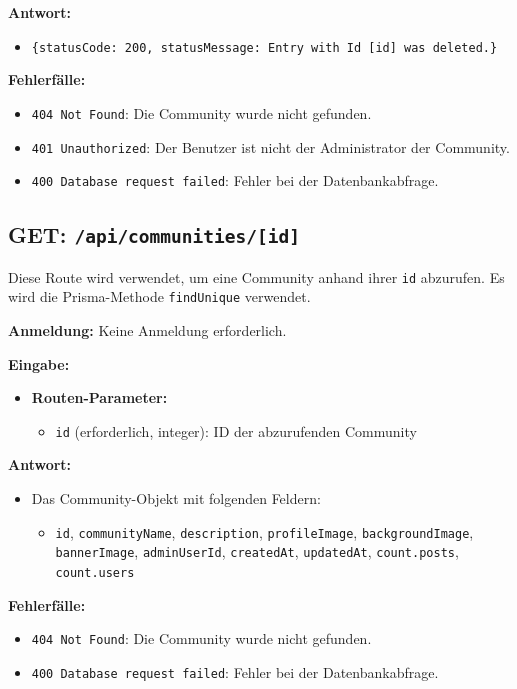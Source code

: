 \documentclass[a4paper,12pt]{article}
\begin{document}
\textbf{Antwort:}
\begin{itemize}
    \item \texttt{\{statusCode: 200, statusMessage: Entry with Id [id] was deleted.\}}
\end{itemize}

\textbf{Fehlerfälle:}
\begin{itemize}
    \item \texttt{404 Not Found}: Die Community wurde nicht gefunden.
    \item \texttt{401 Unauthorized}: Der Benutzer ist nicht der Administrator der Community.
    \item \texttt{400 Database request failed}: Fehler bei der Datenbankabfrage.
\end{itemize}

\newpage
\subsection{GET: \texttt{/api/communities/[id]}}

Diese Route wird verwendet, um eine Community anhand ihrer \texttt{id} abzurufen. Es wird die Prisma-Methode \texttt{findUnique} verwendet.

\textbf{Anmeldung:} Keine Anmeldung erforderlich.

\textbf{Eingabe:}
\begin{itemize}
    \item \textbf{Routen-Parameter:}
    \begin{itemize}
        \item \texttt{id} (erforderlich, integer): ID der abzurufenden Community
    \end{itemize}
\end{itemize}

\textbf{Antwort:}
\begin{itemize}
    \item Das Community-Objekt mit folgenden Feldern:
    \begin{itemize}
        \item \texttt{id}, \texttt{communityName}, \texttt{description}, \texttt{profileImage}, \texttt{backgroundImage}, \texttt{bannerImage}, \texttt{adminUserId}, \texttt{createdAt}, \texttt{updatedAt}, \texttt{count.posts}, \texttt{count.users}
    \end{itemize}
\end{itemize}

\textbf{Fehlerfälle:}
\begin{itemize}
    \item \texttt{404 Not Found}: Die Community wurde nicht gefunden.
    \item \texttt{400 Database request failed}: Fehler bei der Datenbankabfrage.
\end{itemize}
\end{document}
